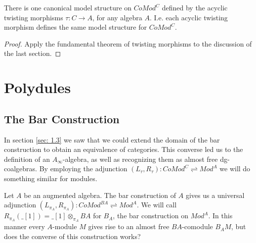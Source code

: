 \documentclass[../thesis.tex]{subfiles}
\begin{document}
            \begin{corollary}
                There is one canonical model structure on $CoMod^C$ defined by the acyclic twisting morphisms $\tau : C \rightarrow A$, for any algebra $A$. I.e. each acyclic twisting morphism defines the same model structure for $CoMod^C$. 
            \end{corollary}

            \begin{proof}
                Apply the fundamental theorem of twisting morphisms to the discussion of the last section.
            \end{proof}

    \section{Polydules}
        \subsection{The Bar Construction}
            In section \ref{sec: 1.3} we saw that we could extend the domain of the bar construction to obtain an equivalence of categories. This converse led us to the definition of an $A_\infty$-algebra, as well as recognizing them as almost free dg-coalgebras. By employing the adjunction $(L_\tau, R_\tau) : CoMod^C \rightleftharpoons Mod^A$ we will do something similar for modules.

            Let $A$ be an augmented algebra. The bar construction of $A$ gives us a universal adjunction $(L_{\pi_A}, R_{\pi_A}) : CoMod^{BA} \rightleftharpoons Mod^A$. We will call $R_{\pi_A}(\_ [1]) = \_ [1]\otimes_{\pi_A}BA$ for $B_A$, the bar construction on $Mod^A$. In this manner every $A$-module $M$ gives rise to an almost free $BA$-comodule $B_AM$, but does the converse of this construction works?
\end{document}
